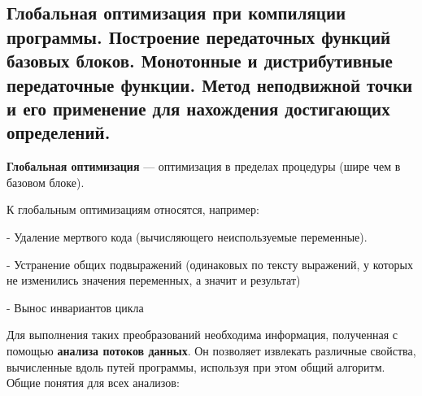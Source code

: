 \subsection{Глобальная оптимизация при компиляции программы. Построение передаточных функций базовых блоков. Монотонные и дистрибутивные передаточные функции. Метод неподвижной точки и его применение для нахождения достигающих определений.}

\textbf{Глобальная оптимизация} --- оптимизация в пределах процедуры (шире чем в базовом блоке).

К глобальным оптимизациям относятся, например:

- Удаление мертвого кода (вычисляющего неиспользуемые переменные).

- Устранение общих подвыражений (одинаковых по тексту выражений, у которых не изменились значения переменных, а значит и результат)

- Вынос инвариантов цикла


Для выполнения таких преобразований необходима информация, полученная с помощью \textbf{анализа потоков данных}. Он позволяет извлекать различные свойства, вычисленные вдоль путей программы, используя при этом общий алгоритм. Общие понятия для всех анализов:

